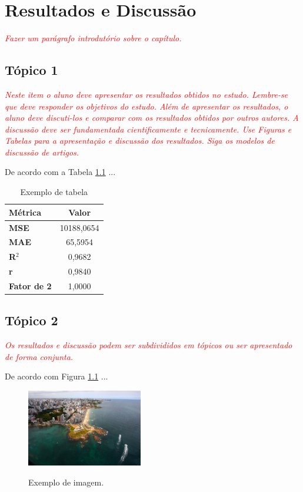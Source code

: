 \chapter{Resultados e Discussão}
\label{ch:resultados_discussao}

\textit{\textcolor{red}{Fazer um parágrafo introdutório sobre o capítulo.}}

\section{Tópico 1}
\label{sec:topico_1}

\textit{\textcolor{red}{Neste item o aluno deve apresentar os resultados obtidos no estudo. Lembre-se que deve responder os objetivos do estudo. Além de apresentar os resultados, o aluno deve discuti-los e comparar com os resultados obtidos por outros autores. A discussão deve ser fundamentada cientificamente e tecnicamente. Use Figuras e Tabelas para a apresentação e discussão dos resultados. Siga os modelos de discussão de artigos.}}

De acordo com a Tabela \ref{tab:exemplo_tabela} ...

\begin{table}[!ht]
	\caption{Exemplo de tabela}
	\centering
	\begin{tabular}{l|c}
		\hline
        \textbf{Métrica} & \textbf{Valor} \\ \hline 
        \textbf{MSE} & 10188,0654 \\ \hline 
        \textbf{MAE} & 65,5954 \\ \hline 
        \textbf{R$^2$} & 0,9682 \\ \hline 
        \textbf{r} & 0,9840 \\ \hline
        \textbf{Fator de 2} & 1,0000 \\ \hline
	\end{tabular}
	\fdp
	\label{tab:exemplo_tabela}
\end{table}

\section{Tópico 2}
\label{sec:topico_2}

\textit{\textcolor{red}{Os resultados e discussão podem ser subdivididos em tópicos ou ser apresentado de forma conjunta.}}

De acordo com Figura \ref{fig:fig_exemplo_imagem3} ...

\begin{figure}[!h]
    \caption{Exemplo de imagem.}
    \centering
    \includegraphics[width=0.45\textwidth]{images/farol_da_barra.jpg}
    \label{fig:fig_exemplo_imagem3}
\end{figure}